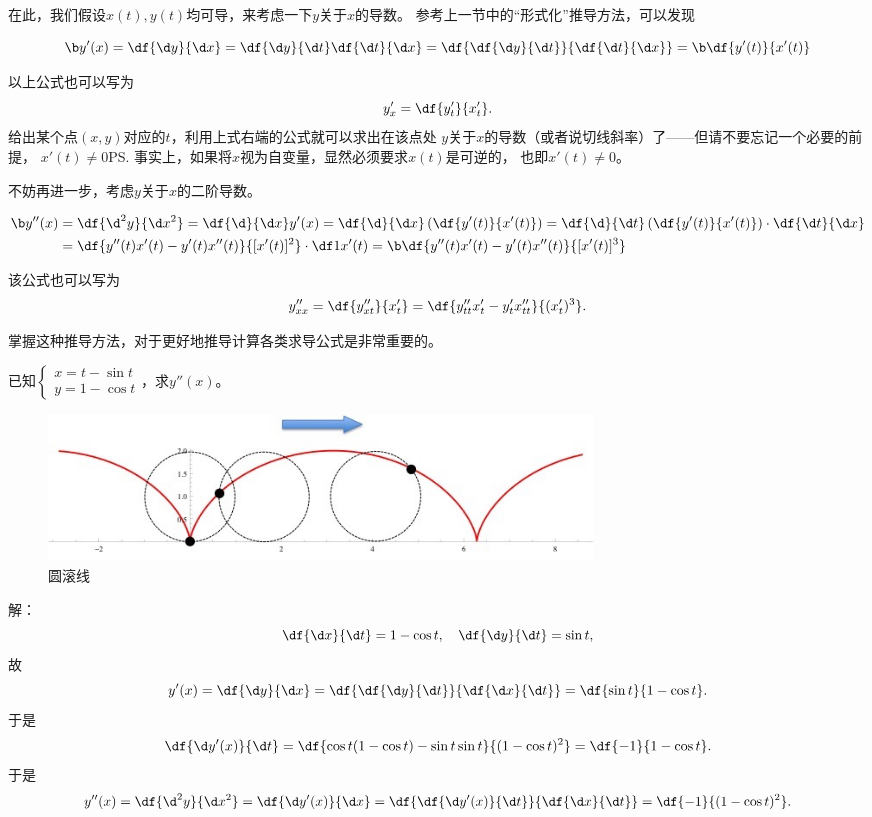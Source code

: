 在此，我们假设$x(t),y(t)$均可导，来考虑一下$y$关于$x$的导数。
参考上一节中的“形式化”推导方法，可以发现
\begin{thx}
	$${\b y'(x)}=\df{\d y}{\d x}=\df{\d y}{\d t}\df{\d t}{\d x}
	=\df{\df{\d y}{\d t}}{\df{\d t}{\d x}}={\b \df{y'(t)}{x'(t)}}$$
\end{thx}
以上公式也可以写为
$$y'_x=\df{y'_t}{x'_t}.$$
给出某个点$(x,y)$对应的$t$，利用上式右端的公式就可以求出在该点处
$y$关于$x$的导数（或者说切线斜率）了——但请不要忘记一个必要的前提，
$x'(t)\ne 0$\ps{事实上，如果将$x$视为自变量，显然必须要求$x(t)$是可逆的，
也即$x'(t)\ne 0$}。

不妨再进一步，考虑$y$关于$x$的二阶导数。
\begin{thx}
	\begin{align*}
		{\b y''(x)}&=\df{\d^2y}{\d x^2}=\df{\d}{\d x}y'(x)
		=\df{\d}{\d x}\left(\df{y'(t)}{x'(t)}\right)
		=\df{\d}{\d t}\left(\df{y'(t)}{x'(t)}\right)\cdot\df{\d t}{\d x}\\
		&=\df{y''(t)x'(t)-y'(t)x''(t)}{[x'(t)]^2}\cdot\df1{x'(t)}
		={\b \df{y''(t)x'(t)-y'(t)x''(t)}{[x'(t)]^3}}
	\end{align*}
\end{thx}
该公式也可以写为
$$y''_{xx}=\df{y''_{xt}}{x'_t}=\df{y''_{tt}x'_t-y'_tx''_{tt}}
{(x'_t)^3}.$$

掌握这种推导方法，对于更好地推导计算各类求导公式是非常重要的。

\bs
\egz 已知$\left\{\begin{array}{l}x=t-\sin t\\
y=1-\cos t\end{array}\right.$，求$y''(x)$。

\begin{figure}[h]
	\centering
	\includegraphics[width=0.7\textwidth]
	{./Images/Ch02/sphereRoll.jpg}
	\caption{圆滚线}
	\label{fig:sphereRoll}
\end{figure}

解：
$$\df{\d x}{\d t}=1-\cos t,\quad \df{\d y}{\d t}=\sin t,$$
故
$$y'(x)=\df{\d y}{\d x}=\df{\df{\d y}{\d t}}{\df{\d x}{\d t}}
=\df{\sin t}{1-\cos t}.$$
于是
$$\df{\d y'(x)}{\d t}=\df{\cos t(1-\cos t)-\sin t\sin t}
{(1-\cos t)^2}=\df{-1}{1-\cos t}.$$
于是
$$y''(x)=\df{\d^2y}{\d x^2}=\df{\d y'(x)}{\d x}
=\df{\df{\d y'(x)}{\d t}}{\df{\d x}{\d t}}
=\df{-1}{(1-\cos t)^2}.$$
\fin

